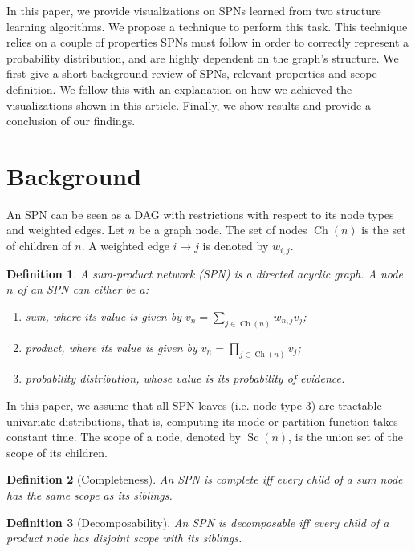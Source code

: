 \documentclass{article}
\newtheorem{definition}{Definition}
\DeclareMathOperator*{\Ch}{\text{Ch}}
\DeclareMathOperator*{\Sc}{\text{Sc}}
\begin{document}
In this paper, we provide visualizations on SPNs learned from two structure learning algorithms. We
propose a technique to perform this task. This technique relies on a couple of properties SPNs must
follow in order to correctly represent a probability distribution, and are highly dependent on the
graph's structure. We first give a short background review of SPNs, relevant properties and scope
definition. We follow this with an explanation on how we achieved the visualizations shown in this
article. Finally, we show results and provide a conclusion of our findings.

\section{Background}
\label{sec:back}

An SPN can be seen as a DAG with restrictions with respect to its node types and weighted edges.
Let $n$ be a graph node. The set of nodes $\Ch(n)$ is the set of children of $n$. A weighted edge
$i\to j$ is denoted by $w_{i,j}$.

\begin{definition}
  A sum-product network (SPN) is a directed acyclic graph. A node $n$ of an SPN can either be a:
  \begin{enumerate}\setlength\itemsep{0em}
    \item sum, where its value is given by $v_n=\sum_{j\in\Ch(n)}w_{n,j}v_j$;
    \item product, where its value is given by $v_n=\prod_{j\in\Ch(n)}v_j$;
    \item probability distribution, whose value is its probability of evidence.
  \end{enumerate}
\end{definition}

In this paper, we assume that all SPN leaves (i.e. node type 3) are tractable univariate
distributions, that is, computing its mode or partition function takes constant time. The scope of
a node, denoted by $\Sc(n)$, is the union set of the scope of its children.

\begin{definition}[Completeness]
  An SPN is complete iff every child of a sum node has the same scope as its siblings.
\end{definition}

\begin{definition}[Decomposability]
  An SPN is decomposable iff every child of a product node has disjoint scope with its siblings.
\end{definition}
\end{document}
